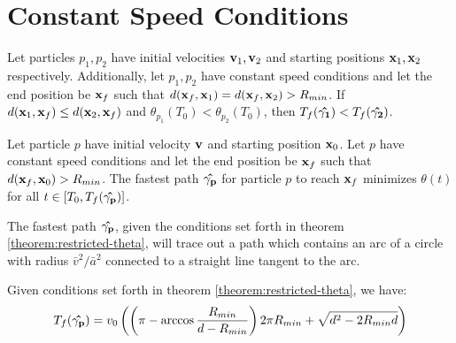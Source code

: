 \section{Constant Speed Conditions}

\begin{conjecture}
  Let particles $p_1, p_2$ have initial velocities $\mathbf{v}_1, \mathbf{v}_2$ and starting positions $\mathbf{x}_1, \mathbf{x}_2$ respectively. Additionally, let $p_1, p_2$ have constant speed conditions and let the end position be $\mathbf{x}_f$ such that $d(\mathbf{x}_f, \mathbf{x}_1) = d(\mathbf{x}_f, \mathbf{x}_2) > R_{min}$. If $d(\mathbf{x}_1, \mathbf{x}_f) \leq d(\mathbf{x}_2, \mathbf{x}_f)$ and $\theta_{p_1}(T_0) < \theta_{p_2}(T_0)$, then $T_f(\mathbf{\hat{\gamma_1}}) < T_f(\mathbf{\hat{\gamma_2}})$.
\end{conjecture}

\begin{theorem}
  Let particle $p$ have initial velocity $\mathbf{v}$ and starting position $\mathbf{x}_0$. Let $p$ have constant speed conditions and let the end position be $\mathbf{x}_f$ such that $d(\mathbf{x}_f, \mathbf{x}_0) > R_{min}$. The fastest path $\mathbf{\hat{\gamma_p}}$ for particle $p$ to reach $\mathbf{x}_f$ minimizes $\theta(t)$ for all $t \in [T_0, T_f(\mathbf{\hat{\gamma_p}})]$.
  \label{theorem:restricted-theta}
\end{theorem}

\begin{corollary}
  The fastest path $\mathbf{\hat{\gamma_p}}$, given the conditions set forth in theorem \ref{theorem:restricted-theta}, will trace out a path which contains an arc of a circle with radius $\bar{v}^2 / \bar{a}^2$ connected to a straight line tangent to the arc.
\end{corollary}

\begin{corollary}
  Given conditions set forth in theorem \ref{theorem:restricted-theta}, we have:
  \begin{eqnarray}
    T_f(\mathbf{\hat{\gamma_p}}) = v_0 \left( \left( \pi - \arccos \frac{R_{min}}{d - R_{min}} \right) 2 \pi R_{min}  + \sqrt{d^2 - 2 R_{min} d}  \right)
  \end{eqnarray}
\end{corollary}
